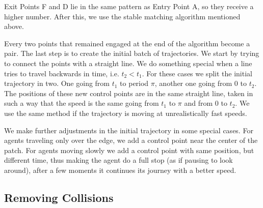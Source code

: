 Exit Points F and D lie in the same pattern as Entry Point A, so they receive a higher number.
After this, we use the stable matching algorithm mentioned above.

Every two points that remained engaged at the end of the algorithm become a pair.
The last step is to create the initial batch of trajectories. We start by trying to connect the points with a straight line. We do something special when a line tries to travel backwards in time, i.e. $t_2<t_1$. For these cases we split the initial trajectory in two. One going from $t_1$ to period $\pi$, another one going from $0$ to $t_2$.  The positions of these new control points are in the same straight line, taken in such a way that the speed is the same going from $t_1$ to $\pi$ and from $0$ to $t_2$. We use the same method if the trajectory is moving at unrealistically fast speeds.

We make further adjustments in the initial trajectory in some special cases. For agents traveling only over the edge, we add a control point near the center of the patch. For agents moving slowly we add a control point with same position, but different time, thus making the agent do a full stop (as if pausing to look around), after a few moments it continues its journey with a better speed.

 




\subsection{Removing Collisions}
\label{sec:method:remove-collisions}

